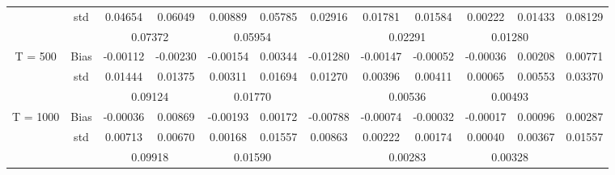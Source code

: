 \documentclass[a4paper,12pt,times,numbered,print,index]{report}
\numberwithin{equation}{section}
\begin{document}
\begin{table}[htbp]
\begin{adjustbox}{max width=\textwidth}
\begin{tabular}{cccccccccccc}
		& std   & 0.04654 & 0.06049 & 0.00889 & 0.05785 & 0.02916 & 0.01781 & 0.01584 & 0.00222 & 0.01433 & 0.08129 \\
		&       & \multicolumn{2}{c}{\textcolor[rgb]{ .329,  .51,  .208}{0.07372}} & \multicolumn{2}{c}{0.05954} &       & \multicolumn{2}{c}{\textcolor[rgb]{ .329,  .51,  .208}{0.02291}} & \multicolumn{2}{c}{0.01280} &  \\
		\multirow{3}[0]{*}{T = 500} & Bias  & -0.00112 & -0.00230 & -0.00154 & 0.00344 & -0.01280 & -0.00147 & -0.00052 & -0.00036 & 0.00208 & 0.00771 \\
		& std   & 0.01444 & 0.01375 & 0.00311 & 0.01694 & 0.01270 & 0.00396 & 0.00411 & 0.00065 & 0.00553 & 0.03370 \\
		&       & \multicolumn{2}{c}{\textcolor[rgb]{ .329,  .51,  .208}{0.09124}} & \multicolumn{2}{c}{0.01770} &       & \multicolumn{2}{c}{\textcolor[rgb]{ .329,  .51,  .208}{0.00536}} & \multicolumn{2}{c}{0.00493} &  \\
		\multirow{3}[1]{*}{T = 1000} & Bias  & -0.00036 & 0.00869 & -0.00193 & 0.00172 & -0.00788 & -0.00074 & -0.00032 & -0.00017 & 0.00096 & 0.00287 \\
		& std   & 0.00713 & 0.00670 & 0.00168 & 0.01557 & 0.00863 & 0.00222 & 0.00174 & 0.00040 & 0.00367 & 0.01557 \\
		&       & \multicolumn{2}{c}{\textcolor[rgb]{ .329,  .51,  .208}{0.09918}} & \multicolumn{2}{c}{0.01590} &       & \multicolumn{2}{c}{\textcolor[rgb]{ .329,  .51,  .208}{0.00283}} & \multicolumn{2}{c}{0.00328} &  \\
		\bottomrule
		\bottomrule
    	\end{tabular}%
		\end{adjustbox}
	\label{nonco-f12}%
\end{table}%
\end{document}

